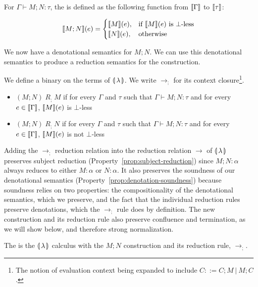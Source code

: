 \begin{definition}
  For $\Gamma \vdash M; N : \tau$, the 
  is defined as the following function from $\llbracket \Gamma \rrbracket$ to $\llbracket \tau \rrbracket$:

  $$
  \llbracket M; N \rrbracket(e) = \begin{cases}
    \llbracket M \rrbracket(e), & \text{if $\llbracket M \rrbracket(e)$ is $\bot$-less} \\
    \llbracket N \rrbracket(e), & \text{otherwise}
  \end{cases}
  $$
\end{definition}

We now have a denotational semantics for $M; N$. We can use this
denotational semantics to produce a reduction semantics for the
construction.

\begin{definition}\label{def:semi-reduction-rule}
  We define a binary  on the terms of
  $\llparenthesis \, \lambda \, \rrparenthesis$. We write $\to_;$ for its context closure\footnote{The
    notion of evaluation context being expanded to include
    $C ::= C; M\ |\ M; C$.}.
  
  \begin{itemize}
  \item $(M; N) \; R_; \; M$ if for every $\Gamma$ and $\tau$ such that
    $\Gamma \vdash M; N : \tau$ and for every $e \in \llbracket \Gamma \rrbracket$,
    $\llbracket M \rrbracket(e)$ is $\bot$-less
  \item $(M; N) \; R_; \; N$ if for every $\Gamma$ and $\tau$ such that
    $\Gamma \vdash M; N : \tau$ and for every $e \in \llbracket \Gamma \rrbracket$,
    $\llbracket M \rrbracket(e)$ is not $\bot$-less
  \end{itemize}
\end{definition}

Adding the $\to_;$ reduction relation into the reduction relation $\to$ of
$\llparenthesis \, \lambda \, \rrparenthesis$ preserves subject reduction
(Property~\ref{prop:subject-reduction}) since $M; N : \alpha$ always
reduces to either $M : \alpha$ or $N : \alpha$. It also preserves the
soundness of our denotational semantics
(Property~\ref{prop:denotation-soundness}) because soundness relies on two
properties: the compositionality of the denotational semantics, which we
preserve, and the fact that the individual reduction rules preserve
denotations, which the $\to_;$ rule does by definition. The new
construction and its reduction rule also preserve confluence and
termination, as we will show below, and therefore strong normalization.

\begin{notation}
  The  is the ${\llparenthesis \, \lambda \, \rrparenthesis}$ calculus with the $M; N$
  construction and its reduction rule, $\to_;$.
\end{notation}

